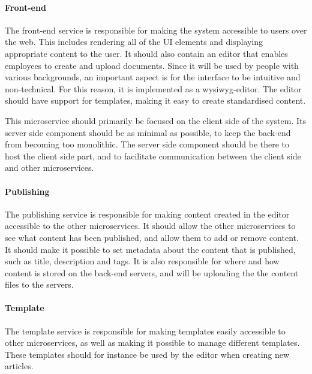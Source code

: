 \paragraph{Front-end}
The front-end service is responsible for making the system accessible to users over the web. This includes rendering all of the UI elements and displaying appropriate content to the user. 
It should also contain an editor that enables employees to create and upload documents. 
Since it will be used by people with various backgrounds, an important aspect is for the interface to be intuitive and non-technical. For this reason, it is implemented as a \acrshort{wysiwyg}-editor. The editor should have support for templates, making it easy to create standardised content.

This microservice should primarily be focused on the client side of the system. Its server side component should be as minimal as possible, to keep the back-end from becoming too monolithic. The server side component should be there to host the client side part, and to facilitate communication between the client side and other microservices.

\paragraph{Publishing}
The publishing service is responsible for making content created in the editor accessible to the other microservices. It should allow the other microservices to see what content has been published, and allow them to add or remove content. It should make it possible to set metadata about the content that is published, such as title, description and tags. It is also responsible for where and how content is stored on the back-end servers, and will be uploading the the content files to the servers.

\paragraph{Template}
The template service is responsible for making templates easily accessible to other microservices, as well as making it possible to manage different templates. These templates should for instance be used by the editor when creating new articles.

